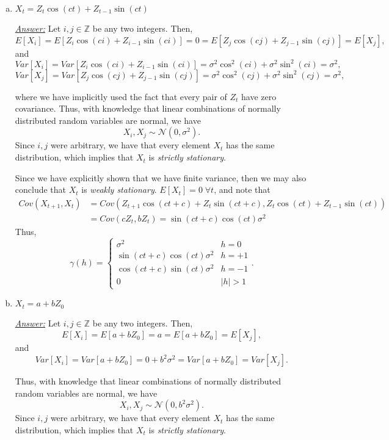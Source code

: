 \documentclass[a4paper, 11pt]{article}
\begin{document}
\begin{itemize}
\begin{enumerate}[(a)]
		\item $X_t = Z_t\cos(ct) + Z_{t-1}\sin(ct)$ \newline 
		
			\underline{\emph{Answer:}} Let $i,j \in \mathbb{Z}$ be any two integers. Then, 
			$$E[X_i] = E[Z_i\cos(ci) + Z_{i-1}\sin(ci)] = 0 = E[Z_j\cos(cj) + Z_{j-1}\sin(cj)] = E[X_j],$$
			and
			$$Var[X_i] = Var[Z_i\cos(ci) + Z_{i-1}\sin(ci)] = \sigma^2\cos^2(ci) + \sigma^2\sin^2(ci) = \sigma^2, $$
			$$Var[X_j] = Var[Z_j\cos(cj) + Z_{j-1}\sin(cj)] = \sigma^2\cos^2(cj) + \sigma^2\sin^2(cj) = \sigma^2, $$

where we have implicitly used the fact that every pair of $Z_t$ have zero covariance. Thus, with knowledge that linear combinations of normally distributed random variables are normal, we have 
$$X_i,X_j \sim \mathcal{N}(0,\sigma^2) .$$
Since $i,j$ were arbitrary, we have that every element $X_t$ has the same distribution, which implies that $X_t$ is \emph{strictly stationary}.  \newline 

Since we have explicitly shown that we have finite variance, then we may also conclude that $X_t$ is \emph{weakly stationary}. $E[X_t] = 0 \; \forall t$, and note that 
\begin{align*}
Cov(X_{t+1},X_t) & = Cov(Z_{t+1}\cos(ct+c) + Z_{t}\sin(ct+c),Z_t\cos(ct) + Z_{t-1}\sin(ct) ) \\
& = Cov(cZ_t,bZ_t) = \sin(ct+c)\cos(ct)\sigma^2
\end{align*}
Thus, 
$$\gamma(h) = \left\{\begin{array}{cc} \sigma^2 & h = 0 \\ \sin(ct+c)\cos(ct)\sigma^2 & h= + 1 \\ \cos(ct+c)\sin(ct)\sigma^2 & h= - 1 \\ 0 & |h|>1 \end{array}\right. .$$
 

		\item $X_t = a + bZ_0$ \newline 
		
			\underline{\emph{Answer:}} Let $i,j \in \mathbb{Z}$ be any two integers. Then, 
			$$E[X_i] = E[a + bZ_0] = a = E[a + bZ_0] = E[X_j],$$
			and
			$$Var[X_i] = Var[a + bZ_0] = 0 + b^2\sigma^2 = Var[a + bZ_0] = Var[X_j].$$

Thus, with knowledge that linear combinations of normally distributed random variables are normal, we have 
$$X_i,X_j \sim \mathcal{N}(0,b^2\sigma^2) .$$
Since $i,j$ were arbitrary, we have that every element $X_t$ has the same distribution, which implies that $X_t$ is \emph{strictly stationary}. \newline 


\end{enumerate}
\end{itemize}
\end{document}
